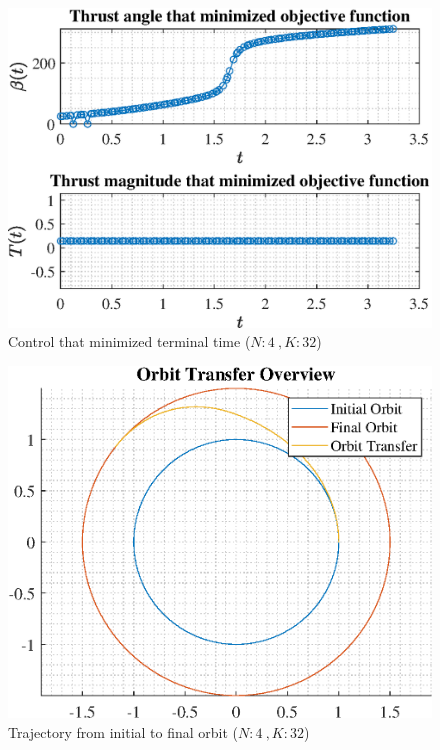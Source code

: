 \documentclass[]{article}
\begin{document}
\begin{figure}
	\centering
	\includegraphics[scale=0.75]{control_N4_K32_C2_tf.eps}
	\caption{Control that minimized terminal time (\(N:4\ , K:32\))}
	\label{fig:control_N4_K32_C2_tf}
\end{figure}
\begin{figure}
	\centering
	\includegraphics[scale=0.75]{orbit_N4_K32_C2_tf.eps}
	\caption{Trajectory from initial to final orbit (\(N:4\ , K:32\))}
	\label{fig:orbit_N4_K32_C2_tf}
\end{figure}
\end{document}
